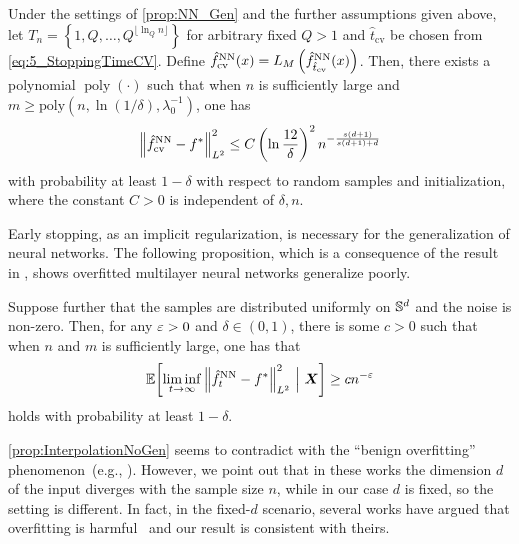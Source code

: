 \begin{proposition}
  \label{prop:NN_CV}
  Under the settings of \cref{prop:NN_Gen} and the further assumptions given above,
  let $T_n = \left\{ 1, Q, \dots,Q^{\lfloor \ln_Q n \rfloor} \right\}$ for arbitrary fixed $Q > 1$ and $\hat{t}_{\mathrm{cv}}$ be chosen from \cref{eq:5_StoppingTimeCV}.
  Define $\hat{f}^{\mathrm{NN}}_{\mathrm{cv}}(x) = L_{M}\left(\hat{f}^{\mathrm{NN}}_{\hat{t}_{\mathrm{cv}}}(x)\right)$.
  Then, there exists a polynomial $\operatorname{poly}(\cdot)$
  such that when $n$ is sufficiently large and $m \geq \mathrm{poly}(n,\ln(1/\delta),\lambda_{0}^{-1})$,
  one has
  \begin{align*}
    \norm{\hat{f}^{\mathrm{NN}}_{\mathrm{cv}} - f^*}_{L^2}^2 \leq C \left( \ln\frac{12}{\delta} \right)^2 n^{-\frac{s(d+1)}{s(d+1)+d}}
  \end{align*}
  with probability at least $1-\delta$ with respect to random samples and initialization,
  where the constant $C>0$ is independent of $\delta,n$.
\end{proposition}

Early stopping, as an implicit regularization, is necessary for the generalization of neural networks.
The following proposition, which is a consequence of the result in \citet{li2023_KernelInterpolation},
shows overfitted multilayer neural networks generalize poorly.
\begin{proposition}
  \label{prop:InterpolationNoGen}
  Suppose further that the samples are distributed uniformly on $\mathbb{S}^d$ and the noise is non-zero.
  Then, for any $\varepsilon > 0$ and $\delta \in (0,1)$, there is some $c > 0$ such that when $n$ and $m$ is sufficiently large,
  one has that
  \begin{align*}
    \E \zkm{\liminf_{t \to \infty} \norm{\hat{f}^{\mathrm{NN}}_t - f^*}_{L^2}^2 ~\Big|~ \X} \geq c n^{-\ep}
  \end{align*}
  holds with probability at least $1-\delta$.
\end{proposition}

\begin{remark}
  \cref{prop:InterpolationNoGen} seems to contradict with the ``benign overfitting'' phenomenon~(e.g., \citet{bartlett2020_BenignOverfittinga,frei2022_BenignOverfitting}).
  However, we point out that in these works the dimension $d$ of the input diverges with the sample size $n$,
  while in our case $d$ is fixed, so the setting is different.
  In fact, in the fixed-$d$ scenario, several works have argued that overfitting is harmful~\citep{rakhlin2018_ConsistencyInterpolation,beaglehole2022_KernelRidgeless,li2023_KernelInterpolation}
  and our result is consistent with theirs.
\end{remark}

